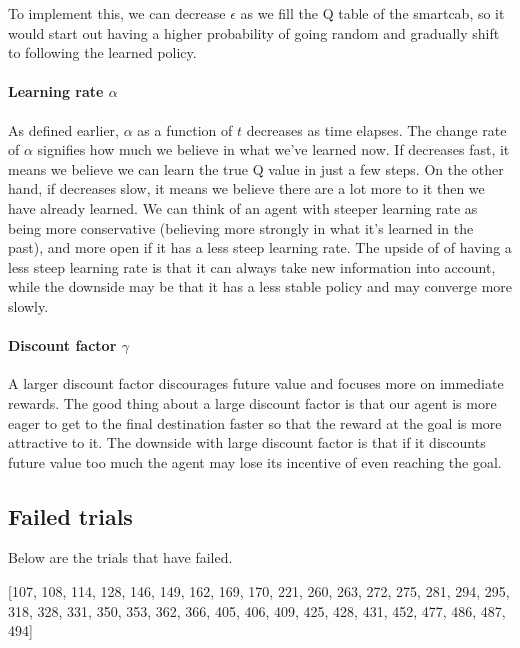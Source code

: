 \documentclass{article}
\begin{document}
To implement this, we can decrease \(\epsilon\) as we fill the Q table
of the smartcab, so it would start out having a higher probability of
going random and gradually shift to following the learned policy.

\paragraph{\texorpdfstring{Learning rate
\(\alpha\)}{Learning rate \textbackslash{}alpha}}\label{learning-rate-alpha}

As defined earlier, \(\alpha\) as a function of \(t\) decreases as time
elapses. The change rate of \(\alpha\) signifies how much we believe in
what we've learned now. If decreases fast, it means we believe we can
learn the true Q value in just a few steps. On the other hand, if
decreases slow, it means we believe there are a lot more to it then we
have already learned. We can think of an agent with steeper learning
rate as being more conservative (believing more strongly in what it's
learned in the past), and more open if it has a less steep learning
rate. The upside of of having a less steep learning rate is that it can
always take new information into account, while the downside may be that
it has a less stable policy and may converge more slowly.

\paragraph{\texorpdfstring{Discount factor
\(\gamma\)}{Discount factor \textbackslash{}gamma}}\label{discount-factor-gamma}

A larger discount factor discourages future value and focuses more on
immediate rewards. The good thing about a large discount factor is that
our agent is more eager to get to the final destination faster so that
the reward at the goal is more attractive to it. The downside with large
discount factor is that if it discounts future value too much the agent
may lose its incentive of even reaching the goal.

\subsection{Failed trials}\label{failed-trials}

Below are the trials that have failed.

{[}107, 108, 114, 128, 146, 149, 162, 169, 170, 221, 260, 263, 272, 275,
281, 294, 295, 318, 328, 331, 350, 353, 362, 366, 405, 406, 409, 425,
428, 431, 452, 477, 486, 487, 494{]}
\end{document}
